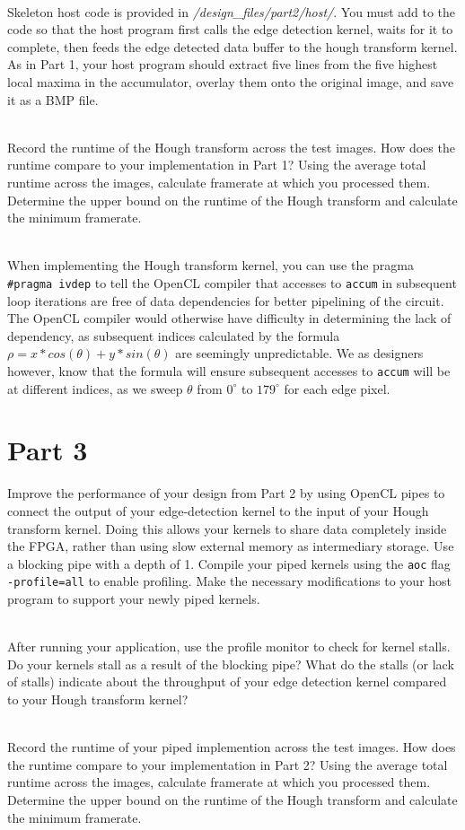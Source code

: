 \documentclass[epsfig,10pt,fullpage]{article}
\newcommand{\CommonDocsPath}{../../common/docs}
\begin{document}
~\\
Skeleton host code is provided in \textit{/design\_files/part2/host/}. You must add to the code so that
the host program first calls the edge detection kernel, waits for it to complete, then feeds the edge detected data
buffer to the hough transform kernel. As in Part 1, your host program should extract five lines from the five 
highest local maxima in the accumulator, overlay them onto the original image, and save it as a BMP file.

~\\
Record the runtime of the Hough transform across the test images. How does the runtime compare to your
implementation in Part 1? Using the average total runtime across the images, calculate framerate at which you processed them.
Determine the upper bound on the runtime of the Hough transform and calculate the minimum framerate.

~\\
When implementing the Hough transform kernel, you can use the pragma \texttt{\#pragma ivdep}
to tell the OpenCL compiler that accesses to \texttt{accum} in subsequent loop iterations are free of data dependencies for
better pipelining of the circuit.
The OpenCL compiler would otherwise have difficulty in determining the lack of dependency, as subsequent indices calculated by
the formula $\rho = x*cos(\theta) + y*sin(\theta)$ are seemingly unpredictable.
We as designers however, know that the formula will ensure subsequent accesses to \texttt{accum} will be at different indices,
as we sweep $\theta$ from $0^\circ$ to $179^\circ$ for each edge pixel.

\section*{Part 3}

Improve the performance of your design from Part 2 by using OpenCL pipes to connect the output of your edge-detection kernel 
to the input of your Hough transform kernel. Doing this allows your kernels to share data completely inside the FPGA,
rather than using slow external memory as intermediary storage. Use a blocking pipe with a depth of 1.
Compile your piped kernels using the \texttt{aoc} flag \texttt{-profile=all} to enable profiling.
Make the necessary modifications to your host program to support your newly piped kernels. 

~\\
After running your application, use the profile monitor to check for kernel stalls.
Do your kernels stall as a result of the blocking pipe? What do the stalls (or lack of stalls)
indicate about the throughput of your edge detection kernel compared to your Hough transform kernel?

~\\
Record the runtime of your piped implemention across the test images. How does the runtime compare to your
implementation in Part 2? Using the average total runtime across the images, calculate framerate at which you processed them.
Determine the upper bound on the runtime of the Hough transform and calculate the minimum framerate.



\end{document}
